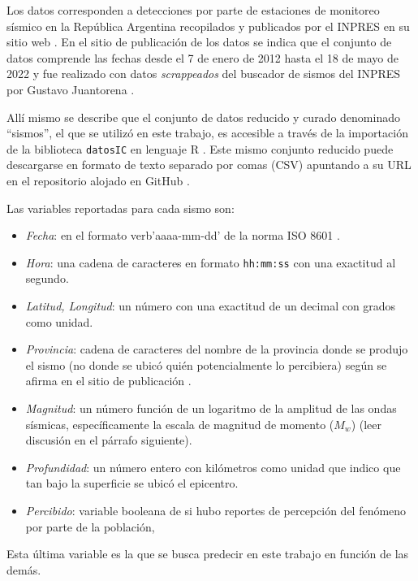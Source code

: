 \documentclass[a4paper]{report}
\begin{document}
Los datos corresponden a detecciones por parte de estaciones de monitoreo sísmico en la República Argentina recopilados y publicados por el INPRES en su sitio web \cite{noauthor_buscador_nodate}.
En el sitio de publicación de los datos se indica que el conjunto de datos comprende las fechas desde el 7 de enero de 2012 hasta el 18 de mayo de 2022 y fue realizado con datos \emph{scrappeados} del buscador de sismos del INPRES por Gustavo Juantorena \cite[sección 4.1]{daniela_parada_ic-datasets-docencia_nodate}. 

Allí mismo se describe que el conjunto de datos reducido y curado denominado ``sismos'', el que se utilizó en este trabajo, es accesible a través de la importación de la biblioteca \texttt{datosIC} en lenguaje R \cite[sección 5.1.1]{daniela_parada_ic-datasets-docencia_nodate}.
Este mismo conjunto reducido puede descargarse en formato de texto separado por comas (CSV) apuntando a su URL en el repositorio alojado en GitHub . 

Las variables reportadas para cada sismo son:
\begin{itemize}
	\item \emph{Fecha}: en el formato verb'aaaa-mm-dd' de la norma ISO 8601 \cite{noauthor_iso_2019}.
	\item \emph{Hora}: una cadena de caracteres en formato \verb'hh:mm:ss' con una exactitud al segundo.
	\item \emph{Latitud, Longitud}: un número con una exactitud de un decimal con grados como unidad.
	\item \emph{Provincia}: cadena de caracteres del nombre de la provincia donde se produjo el sismo (no donde se ubicó quién potencialmente lo percibiera) según se afirma en el sitio de publicación \cite[5.1.1]{daniela_parada_ic-datasets-docencia_nodate}.
	\item \emph{Magnitud}: un número función de un logaritmo de la amplitud de las ondas sísmicas, específicamente la escala de magnitud de momento (\(M_w\)) (leer discusión en el párrafo siguiente).
	\item \emph{Profundidad}: un número entero con kilómetros como unidad que indico que tan bajo la superficie se ubicó el epicentro.
	\item \emph{Percibido}: variable booleana de si hubo reportes de percepción del fenómeno por parte de la población, 
\end{itemize}
Esta última variable es la que se busca predecir en este trabajo en función de las demás. 
\end{document}
